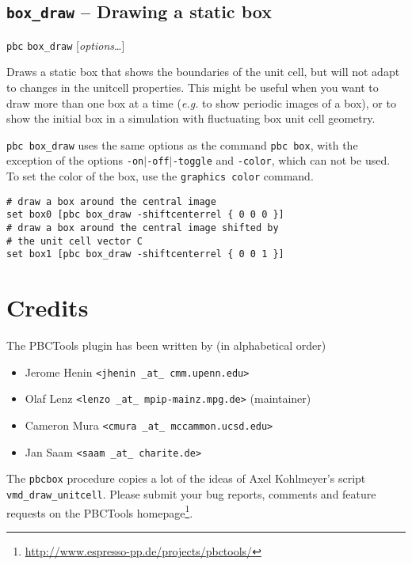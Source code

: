 \documentclass[a4paper, DIV12]{scrartcl}
\newcommand{\eg}{\emph{e.g.}\xspace}
\newcommand{\pbctools}{PBCTools\xspace}
\begin{document}
\newpage
\subsection{\texttt{box\_draw} -- Drawing a static box}
\label{sec:box_draw}


\texttt{pbc} \texttt{box\_draw} [\textit{options}\dots]


Draws a static box that shows the boundaries of the unit cell, but
will not adapt to changes in the unitcell properties. This might be
useful when you want to draw more than one box at a time (\eg to show
periodic images of a box), or to show the initial box in a simulation
with fluctuating box unit cell geometry.


\texttt{pbc box\_draw} uses the same options as the command
\texttt{pbc box}, with the exception of the options
\texttt{-on}$|$\texttt{-off}$|$\texttt{-toggle} and \texttt{-color},
which can not be used. To set the color of the box, use the
\texttt{graphics color} command.


\begin{Verbatim}
# draw a box around the central image 
set box0 [pbc box_draw -shiftcenterrel { 0 0 0 }] 
# draw a box around the central image shifted by 
# the unit cell vector C 
set box1 [pbc box_draw -shiftcenterrel { 0 0 1 }]
\end{Verbatim}

\section{Credits}

The \pbctools plugin has been written by (in alphabetical order)
\begin{itemize}
\item Jerome Henin \texttt{<jhenin \_at\_ cmm.upenn.edu>}
\item Olaf Lenz \texttt{<lenzo \_at\_ mpip-mainz.mpg.de>} (maintainer)
\item Cameron Mura \texttt{<cmura \_at\_ mccammon.ucsd.edu>}
\item Jan Saam \texttt{<saam \_at\_ charite.de>}
\end{itemize}
The \texttt{pbcbox} procedure copies a lot of the ideas of Axel
Kohlmeyer's script \texttt{vmd\_draw\_unitcell}.
Please submit your bug reports, comments and feature requests on the
\pbctools
homepage\footnote{\url{http://www.espresso-pp.de/projects/pbctools/}}.
\end{document}
